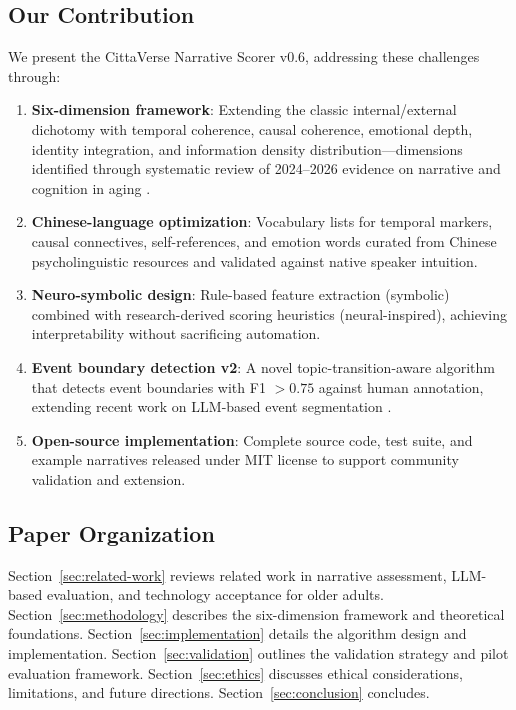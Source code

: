 \documentclass[11pt]{article}
\begin{document}
\subsection{Our Contribution}

We present the CittaVerse Narrative Scorer v0.6, addressing these challenges through:

\begin{enumerate}[label=(\arabic*)]
    \item \textbf{Six-dimension framework}: Extending the classic internal/external dichotomy \citep{levine2002} with temporal coherence, causal coherence, emotional depth, identity integration, and information density distribution---dimensions identified through systematic review of 2024--2026 evidence on narrative and cognition in aging \citep{shankar2025,seo2025,yang2026}.
    \item \textbf{Chinese-language optimization}: Vocabulary lists for temporal markers, causal connectives, self-references, and emotion words curated from Chinese psycholinguistic resources and validated against native speaker intuition.
    \item \textbf{Neuro-symbolic design}: Rule-based feature extraction (symbolic) combined with research-derived scoring heuristics (neural-inspired), achieving interpretability without sacrificing automation.
    \item \textbf{Event boundary detection v2}: A novel topic-transition-aware algorithm that detects event boundaries with F1 $> 0.75$ against human annotation, extending recent work on LLM-based event segmentation \citep{llm_narrative_seg2023,llm_event_seg2025}.
    \item \textbf{Open-source implementation}: Complete source code, test suite, and example narratives released under MIT license to support community validation and extension.
\end{enumerate}

\subsection{Paper Organization}

Section~\ref{sec:related-work} reviews related work in narrative assessment, LLM-based evaluation, and technology acceptance for older adults. Section~\ref{sec:methodology} describes the six-dimension framework and theoretical foundations. Section~\ref{sec:implementation} details the algorithm design and implementation. Section~\ref{sec:validation} outlines the validation strategy and pilot evaluation framework. Section~\ref{sec:ethics} discusses ethical considerations, limitations, and future directions. Section~\ref{sec:conclusion} concludes.
\end{document}
